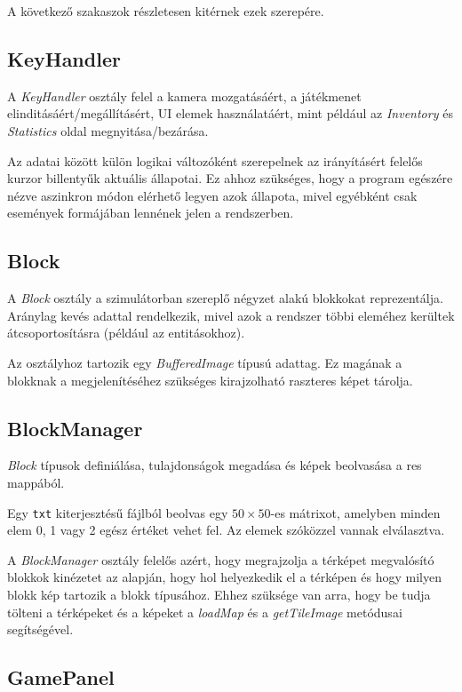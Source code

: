 \noindent A következő szakaszok részletesen kitérnek ezek szerepére.

\subsection{KeyHandler}

A \textit{KeyHandler} osztály felel a kamera mozgatásáért, a játékmenet elinditásáért/megállításért, UI elemek használatáért, 
mint például az \textit{Inventory} és \textit{Statistics} oldal megnyitása/bezárása.

Az adatai között külön logikai változóként szerepelnek az irányításért felelős kurzor billentyűk aktuális állapotai. Ez ahhoz szükséges, hogy a program egészére nézve aszinkron módon elérhető legyen azok állapota, mivel egyébként csak események formájában lennének jelen a rendszerben.

\subsection{Block}

A \textit{Block} osztály a szimulátorban szereplő négyzet alakú blokkokat reprezentálja. Aránylag kevés adattal rendelkezik, mivel azok a rendszer többi eleméhez kerültek átcsoportosításra (például az entitásokhoz).

Az osztályhoz tartozik egy \textit{BufferedImage} típusú adattag. Ez magának a blokknak a megjelenítéséhez szükséges kirajzolható raszteres képet tárolja.

\subsection{BlockManager}

\textit{Block} típusok definiálása, tulajdonságok megadása és képek beolvasása a res mappából.

Egy \texttt{txt} kiterjesztésű fájlból beolvas egy $50 \times 50$-es mátrixot, amelyben minden elem 0, 1 vagy 2 egész értéket vehet fel. Az elemek szóközzel vannak elválasztva.

A \textit{BlockManager} osztály felelős azért, hogy megrajzolja a térképet megvalósító blokkok kinézetet az alapján, hogy hol helyezkedik el a térképen és hogy milyen blokk kép tartozik a blokk típusához. Ehhez szüksége van arra, hogy be tudja tölteni a térképeket és a képeket a \textit{loadMap} és a \textit{getTileImage} metódusai segítségével.

\subsection{GamePanel}

